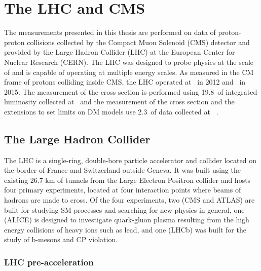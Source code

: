 
\chapter{The LHC and CMS}\label{sec:experiment}

The measurements presented in this thesis are performed
 on data of proton-proton collisions collected %
 by the Compact Muon Solenoid (CMS) detector and
 provided by the
 Large Hadron Collider (LHC) at the 
 European Center for Nuclear Research (CERN).
The LHC was designed to probe physics at the 
 scale of \TeV and is capable of operating at
 multiple energy scales.
As measured in the CM frame
 of protons colliding inside CMS,
 the LHC operated at
 ~\TeV in 2012 and ~\TeV in 2015.
The measurement of the \ppwbb cross section 
 is performed using 19.8~\fbinv of integrated luminosity
 collected at ~\TeV and 
 the measurement of the \ppzgnng cross section
 and the extensions to set limits on DM models 
 use 2.3~\fbinv of data collected at ~\TeV. 

\section{The Large Hadron Collider}
The LHC is a single-ring, double-bore 
 particle accelerator and collider located 
 on the border of France and Switzerland outside Geneva.
It was built using the existing 26.7 km of tunnels from the
 Large Electron Positron collider and hosts
 four primary experiments, located at four
 interaction points where beams of hadrons are made to cross.
Of the four experiments, two (CMS and ATLAS) are built for 
 studying SM processes and searching for new physics in general,
 one (ALICE) is designed to investigate 
 quark-gluon plasma resulting from 
 the high energy collisions of heavy ions such as lead,
 and one (LHCb) was built for the study of
 b-mesons and CP violation.

\subsection{LHC pre-acceleration}

